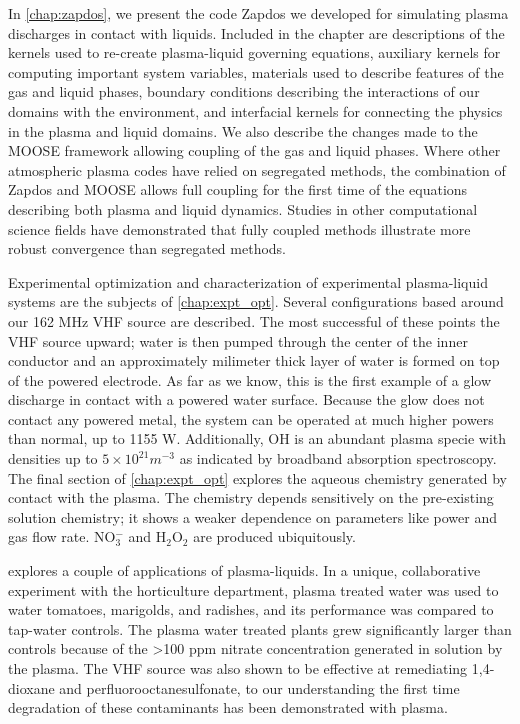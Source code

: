 In \cref{chap:zapdos}, we present the code Zapdos we developed for simulating plasma discharges in contact with liquids. Included in the chapter are descriptions of the kernels used to re-create plasma-liquid governing equations, auxiliary kernels for computing important system variables, materials used to describe features of the gas and liquid phases, boundary conditions describing the interactions of our domains with the environment, and interfacial kernels for connecting the physics in the plasma and liquid domains. We also describe the changes made to the MOOSE framework allowing coupling of the gas and liquid phases. Where other atmospheric plasma codes have relied on segregated methods, the combination of Zapdos and MOOSE allows full coupling for the first time of the equations describing both plasma and liquid dynamics. Studies in other computational science fields have demonstrated that fully coupled methods illustrate more robust convergence than segregated methods. \cite{heil2008solvers}

Experimental optimization and characterization of experimental plasma-liquid systems are the subjects of \cref{chap:expt_opt}. Several configurations based around our 162 MHz VHF source are described. The most successful of these points the VHF source upward; water is then pumped through the center of the inner conductor and an approximately milimeter thick layer of water is formed on top of the powered electrode. As far as we know, this is the first example of a glow discharge in contact with a powered water surface. Because the glow does not contact any powered metal, the system can be operated at much higher powers than normal, up to 1155 W. Additionally, OH is an abundant plasma specie with densities up to $5\times10^{21}m^{-3}$ as indicated by broadband absorption spectroscopy. The final section of \cref{chap:expt_opt} explores the aqueous chemistry generated by contact with the plasma. The chemistry depends sensitively on the pre-existing solution chemistry; it shows a weaker dependence on parameters like power and gas flow rate. NO$_3^-$ and H$_2$O$_2$ are produced ubiquitously.

 explores a couple of applications of plasma-liquids. In a unique, collaborative experiment with the horticulture department, plasma treated water was used to water tomatoes, marigolds, and radishes, and its performance was compared to tap-water controls. The plasma water treated plants grew significantly larger than controls because of the >100 ppm nitrate concentration generated in solution by the plasma. The VHF source was also shown to be effective at remediating 1,4-dioxane and perfluorooctanesulfonate, to our understanding the first time degradation of these contaminants has been demonstrated with plasma.

